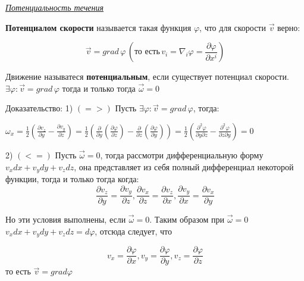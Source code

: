 \begin{center}
  \textit{\underline{Потенциальность течения}}
\end{center}


 \textbf{Потенциалом скорости} называется такая функция $\varphi$, что для скорости $\vec{v}$ верно:

$$
  \vec{v} = grad\, \varphi\, (\text{то есть}\, v_i = \nabla_i \varphi = \frac{\partial \varphi}{\partial x^i})
$$

 Движение называтеся \textbf{потенциальным}, если существует потенциал скорости.
\state $\exists \varphi : \vec{v} = grad\, \varphi$ тогда и только тогда $\vec{\omega} = 0$

Доказательство:
1) $(=>)$ Пусть $\exists \varphi : \vec{v} = grad \, \varphi$, тогда:

$
  \omega_x = \frac{1}{2}(\frac{\partial v_z}{\partial y} - \frac{\partial v_y}{\partial z}) = \frac{1}{2}(\frac{\partial}{\partial y}(\frac{\partial \varphi}{\partial z}) - \frac{\partial}{\partial z}(\frac{\partial \varphi}{\partial y})) = \frac{1}{2} (\frac{\partial^2 \varphi}{\partial y \partial z} - \frac{\partial^2 \varphi}{\partial z \partial y}) = 0
$

2) $(<=)$ Пусть $\vec{\omega} = 0$, тогда рассмотри дифференциальную форму $v_xdx + v_ydy + v_zdz$, она представляет из себя полный дифференциал некоторой функции, тогда и только тогда когда:
$$
  \frac{\partial v_z}{\partial y} = \frac{\partial v_y}{\partial z}, \frac{\partial v_x}{\partial z} = \frac{\partial v_z}{\partial x}, \frac{\partial v_y}{\partial x} = \frac{\partial v_x}{\partial y}
$$

Но эти условия выполнены, если $\vec{\omega} = 0$. Таким образом при $\vec{\omega} = 0$
$v_xdx + v_ydy + v_zdz = d\varphi$, отсюда следует, что

$$
  v_x = \frac{\partial \varphi} {\partial x}, v_y = \frac{\partial \varphi} {\partial y}, v_z = \frac{\partial \varphi} {\partial z}
$$ то есть $\vec{v} = grad\varphi$
